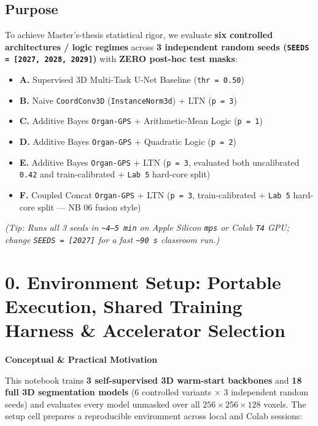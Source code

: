 \documentclass[10pt,a4paper]{article}
\renewcommand{\_}{\origunderscore\allowbreak}
\begin{document}
\subsection*{Purpose}
To achieve Master's-thesis statistical rigor, we evaluate \textbf{six controlled architectures /\allowbreak{} logic regimes} across \textbf{3 independent random seeds (\texttt{SEEDS = [2027, 2028, 2029]})} with \textbf{ZERO post-hoc test masks}:
\begin{itemize}
\item \textbf{A.} Supervised 3D Multi-Task U-Net Baseline (\texttt{thr = 0.50})
\item \textbf{B.} Naive \texttt{CoordConv3D} (\texttt{InstanceNorm3d}) + LTN (\texttt{p = 3})
\item \textbf{C.} Additive Bayes \texttt{Organ-GPS} + Arithmetic-Mean Logic (\texttt{p = 1})
\item \textbf{D.} Additive Bayes \texttt{Organ-GPS} + Quadratic Logic (\texttt{p = 2})
\item \textbf{E.} Additive Bayes \texttt{Organ-GPS} + LTN (\texttt{p = 3}, evaluated both uncalibrated \texttt{0.42} and train-calibrated + \texttt{Lab 5} hard-core split)
\item \textbf{F.} Coupled Concat \texttt{Organ-GPS} + LTN (\texttt{p = 3}, train-calibrated + \texttt{Lab 5} hard-core split --- NB 06 fusion style)
\end{itemize}

\textit{(Tip: Runs all 3 seeds in \texttt{\textasciitilde{}4--5 min} on Apple Silicon \texttt{mps} or Colab \texttt{T4} GPU; change \texttt{SEEDS = [2027]} for a fast \texttt{\textasciitilde{}90 s} classroom run.)}

\section*{0. Environment Setup: Portable Execution, Shared Training Harness \& Accelerator Selection}

\begin{guidehdr}
{\small\bfseries\color{kiwigreen!75!black}Conceptual \& Practical Motivation}
\end{guidehdr}
This notebook trains \textbf{3 self-supervised 3D warm-start backbones} and \textbf{18 full 3D segmentation models} (6 controlled variants $\times$ 3 independent random seeds) and evaluates every model unmasked over all $256 \times 256 \times 128$ voxels. The setup cell prepares a reproducible environment across local and Colab sessions:
\end{document}
